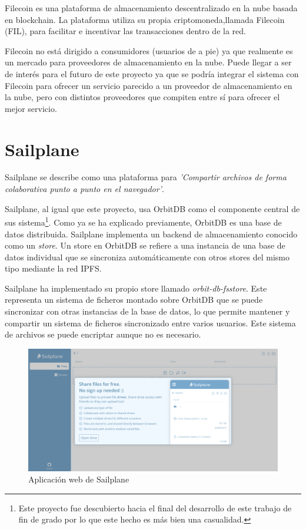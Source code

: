 Filecoin\cite{filecoinDecentralizedStorageNetwork} es una plataforma de almacenamiento descentralizado en la nube basada en
blockchain. La plataforma utiliza su propia criptomoneda,llamada Filecoin (FIL), para facilitar e incentivar las transacciones dentro
de la red.

Filecoin no está dirigido a consumidores (usuarios de a pie) ya que realmente es un mercado para proveedores de almacenamiento en la nube. Puede llegar
a ser de interés para el futuro de este proyecto ya que se podría integrar el sistema con Filecoin para ofrecer un servicio parecido
a un proveedor de almacenamiento en la nube, pero con distintos proveedores que compiten entre sí para ofrecer el mejor servicio.

\section{Sailplane}\label{sec:sailplane}

Sailplane se describe como una plataforma para \textit{'Compartir archivos de forma colaborativa punto a punto en el navegador'}.

Sailplane, al igual que este proyecto, usa OrbitDB como el componente central de sus sistema\footnote{Este proyecto fue descubierto
    hacia el final del desarrollo de este trabajo de fin de grado por lo que este hecho es más bien una casualidad.}.
Como ya se ha explicado previamente, OrbitDB es una base de datos distribuida. Sailplane implementa un backend de almacenamiento
conocido como un \textit{store}. Un store en OrbitDB se refiere a una instancia de una base de datos individual que se sincroniza
automáticamente con otros stores del mismo tipo mediante la red IPFS.

Sailplane ha implementado su propio store llamado \textit{orbit-db-fsstore}\cite{TabcatOrbitdbfsstoreCustom}. Este representa
un sistema de ficheros montado sobre OrbitDB que se puede sincronizar con otras instancias de la base de datos, lo que permite
mantener y compartir un sistema de ficheros sincronizado entre varios usuarios. Este sistema de archivos se puede encriptar aunque no es necesario.

\begin{figure}[H]
    \centering
    \small
    \includegraphics[width=\linewidth]{images/sailplane.png}
    \caption{Aplicación web de Sailplane}
    \label{fig:sailplaneweb}
\end{figure}

